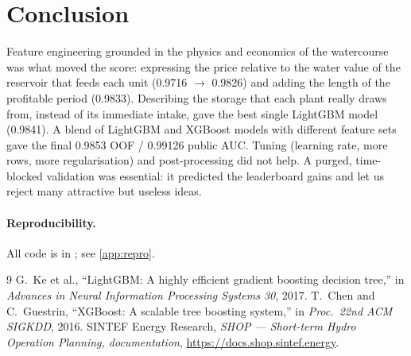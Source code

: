 \documentclass[11pt,a4paper]{article}
\newcommand{\code}[1]{\texttt{\detokenize{#1}}}
\begin{document}
\section{Conclusion}
Feature engineering grounded in the physics and economics of the watercourse was what moved the score:
expressing the price relative to the water value of the reservoir that feeds each unit (0.9716 $\to$ 0.9826)
and adding the length of the profitable period (0.9833). Describing the storage that each plant really draws
from, instead of its immediate intake, gave the best single LightGBM model (0.9841). A blend of LightGBM and
XGBoost models with different feature sets gave the final 0.9853 OOF / 0.99126 public AUC. Tuning
(learning rate, more rows, more regularisation) and post-processing did not help. A purged, time-blocked
validation was essential: it predicted the leaderboard gains and let us reject many attractive but useless
ideas.

\paragraph{Reproducibility.} All code is in \code{src/}; see \cref{app:repro}.

\begin{thebibliography}{9}
 G.~Ke et al., ``LightGBM: A highly efficient gradient boosting decision tree,'' in
\emph{Advances in Neural Information Processing Systems 30}, 2017.
 T.~Chen and C.~Guestrin, ``XGBoost: A scalable tree boosting system,'' in \emph{Proc.\ 22nd ACM
SIGKDD}, 2016.
 SINTEF Energy Research, \emph{SHOP --- Short-term Hydro Operation Planning, documentation},
\url{https://docs.shop.sintef.energy}.
\end{thebibliography}

\appendix
\end{document}
